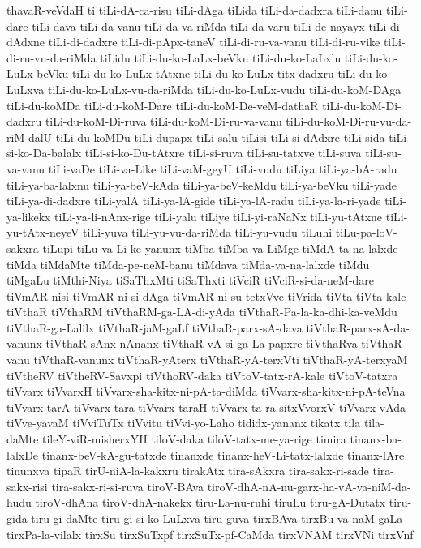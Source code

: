 {thavaR-veVdaH
ti
tiLi-dA-ca-risu
tiLi-dAga
tiLida
tiLi-da-dadxra
tiLi-danu
tiLi-dare
tiLi-dava
tiLi-da-vanu
tiLi-da-va-riMda
tiLi-da-varu
tiLi-de-nayayx
tiLi-di-dAdxne
tiLi-di-dadxre
tiLi-di-pApx-taneV
tiLi-di-ru-va-vanu
tiLi-di-ru-vike
tiLi-di-ru-vu-da-riMda
tiLidu
tiLi-du-ko-LaLx-beVku
tiLi-du-ko-LaLxlu
tiLi-du-ko-LuLx-beVku
tiLi-du-ko-LuLx-tAtxne
tiLi-du-ko-LuLx-titx-dadxru
tiLi-du-ko-LuLxva
tiLi-du-ko-LuLx-vu-da-riMda
tiLi-du-ko-LuLx-vudu
tiLi-du-koM-DAga
tiLi-du-koMDa
tiLi-du-koM-Dare
tiLi-du-koM-De-veM-dathaR
tiLi-du-koM-Di-dadxru
tiLi-du-koM-Di-ruva
tiLi-du-koM-Di-ru-va-vanu
tiLi-du-koM-Di-ru-vu-da-riM-dalU
tiLi-du-koMDu
tiLi-dupapx
tiLi-salu
tiLisi
tiLi-si-dAdxre
tiLi-sida
tiLi-si-ko-Da-balalx
tiLi-si-ko-Du-tAtxre
tiLi-si-ruva
tiLi-su-tatxve
tiLi-suva
tiLi-su-va-vanu
tiLi-vaDe
tiLi-va-Like
tiLi-vaM-geyU
tiLi-vudu
tiLiya
tiLi-ya-bA-radu
tiLi-ya-ba-lalxnu
tiLi-ya-beV-kAda
tiLi-ya-beV-keMdu
tiLi-ya-beVku
tiLi-yade
tiLi-ya-di-dadxre
tiLi-yalA
tiLi-ya-lA-gide
tiLi-ya-lA-radu
tiLi-ya-la-ri-yade
tiLi-ya-likekx
tiLi-ya-li-nAnx-rige
tiLi-yalu
tiLiye
tiLi-yi-raNaNx
tiLi-yu-tAtxne
tiLi-yu-tAtx-neyeV
tiLi-yuva
tiLi-yu-vu-da-riMda
tiLi-yu-vudu
tiLuhi
tiLu-pa-loV-sakxra
tiLupi
tiLu-va-Li-ke-yanunx
tiMba
tiMba-va-LiMge
tiMdA-ta-na-lalxde
tiMda
tiMdaMte
tiMda-pe-neM-banu
tiMdava
tiMda-va-na-lalxde
tiMdu
tiMgaLu
tiMthi-Niya
tiSaThxMti
tiSaThxti
tiVciR
tiVciR-si-da-neM-dare
tiVmAR-nisi
tiVmAR-ni-si-dAga
tiVmAR-ni-su-tetxVve
tiVrida
tiVta
tiVta-kale
tiVthaR
tiVthaRM
tiVthaRM-ga-LA-di-yAda
tiVthaR-Pa-la-ka-dhi-ka-veMdu
tiVthaR-ga-Lalilx
tiVthaR-jaM-gaLf
tiVthaR-parx-sA-dava
tiVthaR-parx-sA-da-vanunx
tiVthaR-sAnx-nAnanx
tiVthaR-vA-si-ga-La-papxre
tiVthaRva
tiVthaR-vanu
tiVthaR-vanunx
tiVthaR-yAterx
tiVthaR-yA-terxVti
tiVthaR-yA-terxyaM
tiVtheRV
tiVtheRV-Savxpi
tiVthoRV-daka
tiVtoV-tatx-rA-kale
tiVtoV-tatxra
tiVvarx
tiVvarxH
tiVvarx-sha-kitx-ni-pA-ta-diMda
tiVvarx-sha-kitx-ni-pA-teVna
tiVvarx-tarA
tiVvarx-tara
tiVvarx-taraH
tiVvarx-ta-ra-sitxVvorxV
tiVvarx-vAda
tiVve-yavaM
tiVviTuTx
tiVvitu
tiVvi-yo-Laho
tididx-yananx
tikatx
tila
tila-daMte
tileY-viR-misherxYH
tiloV-daka
tiloV-tatx-me-ya-rige
timira
tinanx-ba-lalxDe
tinanx-beV-kA-gu-tatxde
tinanxde
tinanx-heV-Li-tatx-lalxde
tinanx-lAre
tinunxva
tipaR
tirU-niA-la-kakxru
tirakAtx
tira-sAkxra
tira-sakx-ri-sade
tira-sakx-risi
tira-sakx-ri-si-ruva
tiroV-BAva
tiroV-dhA-nA-nu-garx-ha-vA-va-niM-da-hudu
tiroV-dhAna
tiroV-dhA-nakekx
tiru-La-nu-ruhi
tiruLu
tiru-gA-Dutatx
tiru-gida
tiru-gi-daMte
tiru-gi-si-ko-LuLxva
tiru-guva
tirxBAva
tirxBu-va-naM-gaLa
tirxPa-la-vilalx
tirxSu
tirxSuTxpf
tirxSuTx-pf-CaMda
tirxVNAM
tirxVNi
tirxVnf
}
